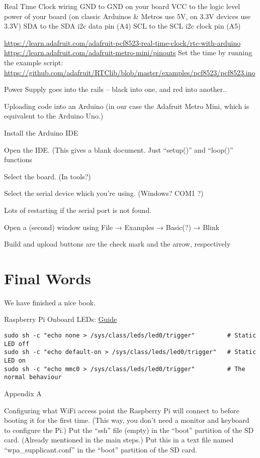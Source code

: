 \documentclass[]{book}
\begin{document}
Real Time Clock wiring
GND to GND on your board
VCC to the logic level power of your board (on classic Arduinos \& Metros use 5V, on 3.3V devices use 3.3V)
SDA to the SDA i2c data pin (A4)
SCL to the SCL i2c clock pin (A5)

\url{https://learn.adafruit.com/adafruit-pcf8523-real-time-clock/rtc-with-arduino}
\url{https://learn.adafruit.com/adafruit-metro-mini/pinouts}
Set the time by running the example script: \url{https://github.com/adafruit/RTClib/blob/master/examples/pcf8523/pcf8523.ino}

Power Supply goes into the rails -- black into one, and red into another..

Uploading code into an Arduino (in our case the Adafruit Metro Mini, which is equivalent to the Arduino Uno.)

Install the Arduino IDE

Open the IDE. (This gives a blank document. Just ``setup()'' and ``loop()'' functions

Select the board. (In tools?)

Select the serial device which you're using. (Windows? COM1 ?)

Lots of restarting if the serial port is not found.

Open a (second) window using File → Examples → Basic(?) → Blink

Build and upload buttons are the check mark and the arrow, respectively

\hypertarget{final-words}{%
\chapter{Final Words}\label{final-words}}

We have finished a nice book.

Raspberry Pi Onboard LEDs: \href{https://raspberrypi.stackexchange.com/questions/44168/how-can-i-control-the-red-led-again/61955\#61955}{Guide}

\begin{verbatim}
sudo sh -c "echo none > /sys/class/leds/led0/trigger"         # Static LED off 
sudo sh -c "echo default-on > /sys/class/leds/led0/trigger"   # Static LED on 
sudo sh -c "echo mmc0 > /sys/class/leds/led0/trigger"         # The normal behaviour
\end{verbatim}

Appendix A

Configuring what WiFi access point the Raspberry Pi will connect to before booting it for the first time. (This way, you don't need a monitor and keyboard to configure the Pi.)
Put the ``ssh'' file (empty) in the ``boot'' partition of the SD card. (Already mentioned in the main steps.)
Put this in a text file named ``wpa\_supplicant.conf'' in the ``boot'' partition of the SD card.
\end{document}
